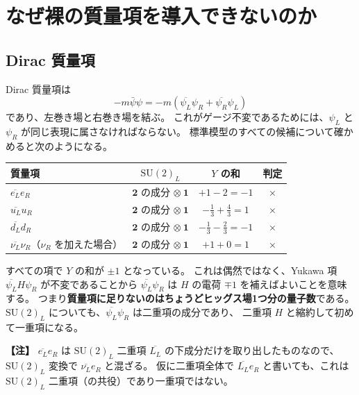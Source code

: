 \documentclass[uplatex,dvipdfmx,a4paper,11pt,openany]{jsbook}
\newenvironment{note}{\vspace{1ex}\par\footnotesize\noindent\textbf{【注】}}{\par\vspace{1ex}}
\numberwithin{equation}{chapter}
\theoremstyle{definition}
\theoremstyle{plain}
\theoremstyle{remark}
\newcommand{\SU}{\mathrm{SU}}
\begin{document}
\section{なぜ裸の質量項を導入できないのか}
\label{sec:no-bare-mass}
\subsection{Dirac 質量項}
Dirac 質量項は
\begin{equation}
-m\bar\psi\psi=-m\left(\overline{\psi_L}\psi_R+\overline{\psi_R}\psi_L\right)
\end{equation}
であり、左巻き場と右巻き場を結ぶ。
これがゲージ不変であるためには、$\psi_L$ と $\psi_R$ が同じ表現に属さなければならない。
標準模型のすべての候補について確かめると次のようになる。
\begin{center}
\renewcommand{\arraystretch}{1.3}
\begin{tabular}{lccc}
\toprule
質量項 & $\SU(2)_L$ & $Y$ の和 & 判定\\
\midrule
$\overline{e_L}e_R$ & $\mathbf2$ の成分 $\otimes\ \mathbf1$ & $+1-2=-1$ & ×\\
$\overline{u_L}u_R$ & $\mathbf2$ の成分 $\otimes\ \mathbf1$ & $-\frac13+\frac43=1$ & ×\\
$\overline{d_L}d_R$ & $\mathbf2$ の成分 $\otimes\ \mathbf1$ & $-\frac13-\frac23=-1$ & ×\\
$\overline{\nu_L}\nu_R$（$\nu_R$ を加えた場合） & $\mathbf2$ の成分 $\otimes\ \mathbf1$ & $+1+0=1$ & ×\\
\bottomrule
\end{tabular}
\end{center}
すべての項で $Y$ の和が $\pm1$ となっている。
これは偶然ではなく、Yukawa 項 $\overline{\psi_L}H\psi_R$ が不変であることから
$\overline{\psi_L}\psi_R$ は $H$ の電荷 $\mp1$ を補えばよいことを意味する。
つまり\textbf{質量項に足りないのはちょうどヒッグス場1つ分の量子数}である。
$\SU(2)_L$ についても、$\overline{\psi_L}\psi_R$ は二重項の成分であり、
二重項 $H$ と縮約して初めて一重項になる。
\begin{note}
$\overline{e_L}e_R$ は $\SU(2)_L$ 二重項 $\overline{L_L}$ の下成分だけを取り出したものなので、
$\SU(2)_L$ 変換で $\overline{\nu_L}e_R$ と混ざる。
仮に二重項全体で $\overline{L_L}e_R$ と書いても、これは $\SU(2)_L$ 二重項（の共役）であり一重項ではない。
\end{note}
\end{document}
